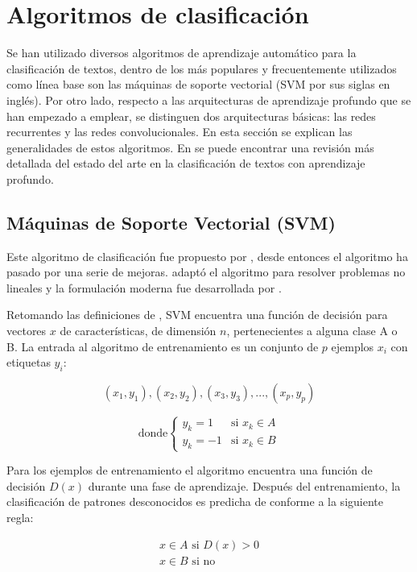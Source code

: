 \section{Algoritmos de clasificación}
Se han utilizado diversos algoritmos de aprendizaje automático para la clasificación de textos, dentro de los más populares y frecuentemente utilizados como línea base son las máquinas de soporte vectorial (SVM por sus siglas en inglés). Por otro lado, respecto a las arquitecturas de aprendizaje profundo que se han empezado a emplear, se distinguen dos arquitecturas básicas: las redes recurrentes y las redes convolucionales. En esta sección se explican las generalidades de estos algoritmos. En \citep{Minaee2020} se puede encontrar una revisión más detallada del estado del arte en la clasificación de textos con aprendizaje profundo.


\subsection{Máquinas de Soporte Vectorial (SVM)}
Este algoritmo de clasificación fue propuesto por \citep{vapnik1964class}, desde entonces el algoritmo ha pasado por una serie de mejoras. \citep{boser1992training} adaptó el algoritmo para resolver problemas no lineales y la formulación moderna fue desarrollada por \citep{cortes1995support}.

Retomando las definiciones de \citep{boser1992training}, SVM encuentra una función de decisión para vectores $x$ de características, de dimensión $n$, pertenecientes a alguna clase A o B. La entrada al algoritmo de entrenamiento es un conjunto de $p$ ejemplos $x_i$ con etiquetas $y_i$:

\begin{equation} \label{eq:training}
(x_1, y_1), (x_2, y_2), (x_3, y_3), ... , (x_p, y_p) 
\end{equation}

\[
    \text{donde}
    \begin{cases}
        y_k=1 & \text{si $x_k \in A$}\\
        y_k=-1 & \text{si $x_k \in B$}
    \end{cases}
\]

Para los ejemplos de entrenamiento el algoritmo encuentra una función de decisión $D(x)$ durante una fase de aprendizaje. Después del entrenamiento, la clasificación de patrones desconocidos es predicha de conforme a la siguiente regla:

\begin{equation} \label{eq:svm_de}
\begin{split}
    x \in A \text{ si } D(x)>0 \\
    x \in B \text{ si no } 
\end{split}
\end{equation}

